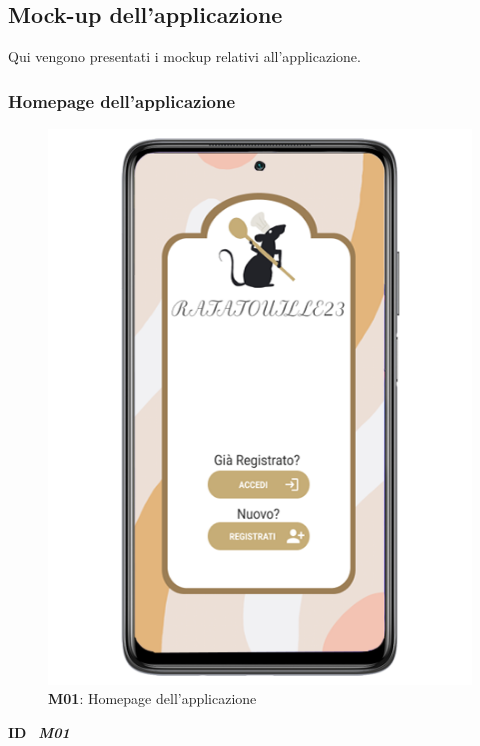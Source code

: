 \subsection{Mock-up dell'applicazione}
    \begin{flushleft}
        Qui vengono presentati i mockup relativi all'applicazione.
    \end{flushleft}
    \subsubsection{Homepage dell'applicazione}
        \begin{figure}[H]
            \centering
            \includegraphics[scale=2.5]{assets/Mockup/Mockup_Homepage.png}
            \caption{\textbf{M01}: Homepage dell'applicazione}
            \label{fig:Mockup_Homepage}
        \end{figure}
        \begin{flushleft}
            \textbf{ID} \ \Large{\textit{\textbf{M01}}}\\
        \end{flushleft}

